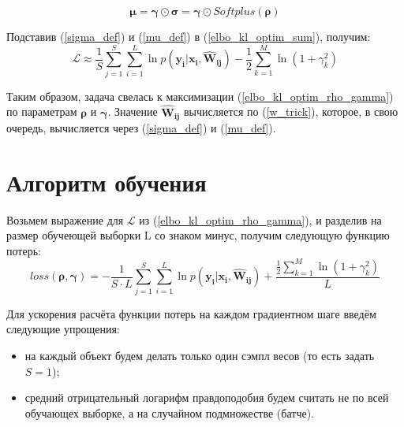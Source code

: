\documentclass{article}
\numberwithin{equation}{section}
\begin{document}
    \begin{equation}\label{mu_def}
        \pmb{\mu} = \pmb{\gamma} \odot \pmb{\sigma} = \pmb{\gamma} \odot Softplus (\pmb{\rho})
    \end{equation}

    Подставив (\ref{sigma_def}) и (\ref{mu_def}) в (\ref{elbo_kl_optim_sum}), получим:
    \begin{equation}\label{elbo_kl_optim_rho_gamma}
        \mathcal{L}
        \approx
            \frac{1}{S} \sum_{j=1}^S \sum_{i=1}^{L} {
                \ln{
                    p(\pmb{y_{i}} | \pmb{x_{i}}, \pmb{\hat{W}_{ij}})
                }
            }
        -
            \frac{1}{2} \sum_{k=1}^{M} \ln(
                {1 + \gamma_{k}^{2}}
            )
    \end{equation}

    Таким образом, задача свелась к максимизации (\ref{elbo_kl_optim_rho_gamma})
    по параметрам $\pmb{\rho}$ и $\pmb{\gamma}$.
    Значение $\pmb{\hat{W}_{ij}}$ вычисляется по (\ref{w_trick}),
    которое, в свою очередь, вычисляется через
    (\ref{sigma_def}) и (\ref{mu_def}).

    \section{Алгоритм обучения}
    Возьмем выражение для $\mathcal{L}$ из (\ref{elbo_kl_optim_rho_gamma}),
    и разделив на размер обучеющей выборки L со знаком минус,
    получим следующую функцию потерь:
    \begin{equation}\label{loss_init}
        loss(\pmb{\rho}, \pmb{\gamma})
        =
            - \frac
                {1}
                {S \cdot L}
            \sum_{j=1}^S
            \sum_{i=1}^{L}
                {\ln{
                    p(\pmb{y_{i}} | \pmb{x_{i}}, \pmb{\hat{W}_{ij}})
                }
            }
            +
            \frac
                {
                    \frac{1}{2} \sum_{k=1}^{M} \ln(
                        {1 + \gamma_{k}^{2}}
                    )
                }
                {L}
    \end{equation}

    Для ускорения расчёта функции потерь на каждом градиентном шаге введём следующие упрощения:
    \begin{itemize}
        \item на каждый объект будем делать только один сэмпл весов (то есть задать $S=1$);
        \item средний отрицательный логарифм правдоподобия будем считать не по всей обучающех выборке,
            а на случайном подмножестве (батче).
    \end{itemize}
\end{document}
